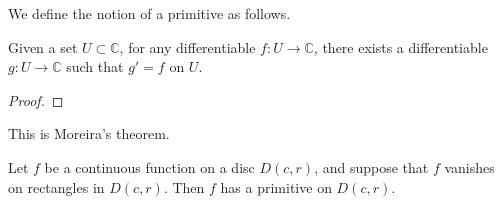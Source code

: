 
We define the notion of a primitive as follows.



\begin{definition}
  \label{HasPrimitives}
  \leanok
  Given a set $U\subset\mathbb C$, for any differentiable $f:U\to\mathbb C$, there exists a differentiable $g:U\to\mathbb C$ such that $g'=f$ on $U$.
\end{definition}

 \begin{proof}
 \end{proof}

This is Moreira's theorem.
\begin {theorem}
\label {moreira}
\leanok
Let $f$ be a continuous function on a disc $D(c,r)$, and suppose that $f$ vanishes on rectangles in $D(c,r)$. Then $f$ has a primitive on $D(c,r)$.
\end {theorem}

